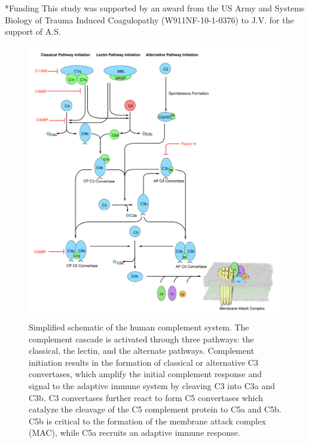 \documentclass[12pt]{article}
\makeatletter
\renewcommand\section{\@startsection
	{subsection}{2}{0mm}
	{-0.2in}
	{0.05\baselineskip}
	{\normalfont\large\bfseries}}
\makeatother
\begin{document}
\section*{Funding}
This study was supported by an award from the US Army and Systems Biology of Trauma Induced Coagulopathy (W911NF-10-1-0376) to J.V. for the support of A.S.

\clearpage




\clearpage


\begin{figure}[h]
\centering
\includegraphics[width=1.0\textwidth]{./figs/Fig1_Schematic_v2.pdf}
\caption{Simplified schematic of the human complement system. The complement cascade is activated through three pathways:  the classical, the lectin, and the alternate pathways.
Complement initiation results in the formation of classical or alternative C3 convertases, which amplify the initial complement response and signal to the adaptive immune system by cleaving C3 into C3a and C3b. C3 convertases further react to form C5 convertases which catalyze the cleavage of the C5 complement protein to C5a and C5b.
C5b is critical to the formation of the membrane attack complex (MAC), while C5a recruits an adaptive immune response.}\label{fig-schematic}
\end{figure}
\end{document}
